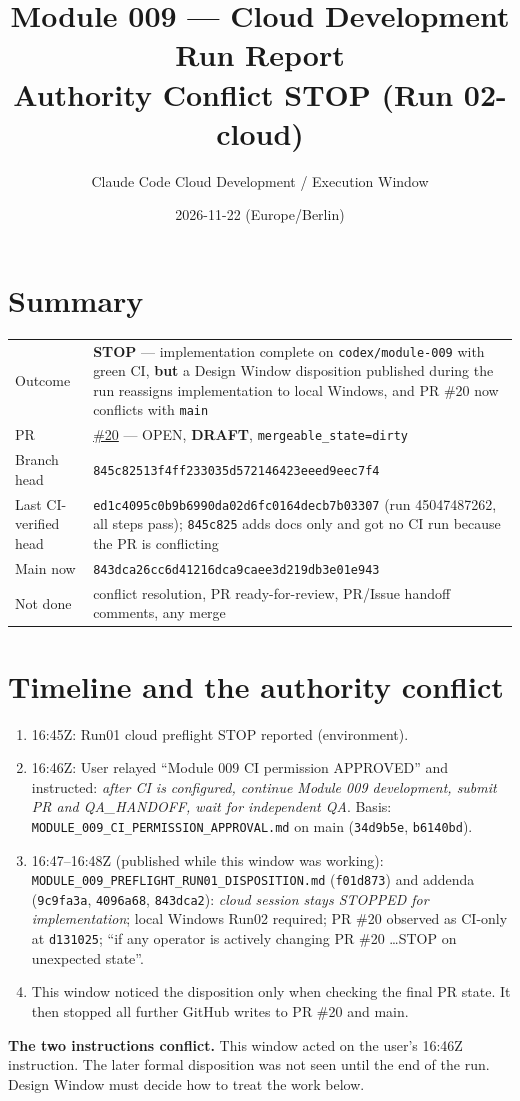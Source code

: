 \documentclass[11pt,a4paper]{article}
\title{Module 009 --- Cloud Development Run Report\\Authority Conflict STOP (Run 02-cloud)}
\author{Claude Code Cloud Development / Execution Window}
\date{2026-11-22 (Europe/Berlin)}
\newcommand{\sha}[1]{\texttt{\small #1}}
\newcommand{\STOP}{\textcolor{red!70!black}{\textbf{STOP}}}
\begin{document}
\maketitle

\section*{Summary}
\begin{tabularx}{\textwidth}{@{}lX@{}}
\toprule
Outcome & \STOP{} --- implementation complete on \texttt{codex/module-009} with green CI, \textbf{but} a Design Window disposition published during the run reassigns implementation to local Windows, and PR \#20 now conflicts with \texttt{main} \\
PR & \href{https://github.com/zyyu1/personal-workspace/pull/20}{\#20} --- OPEN, \textbf{DRAFT}, \texttt{mergeable\_state=dirty} \\
Branch head & \sha{845c82513f4ff233035d572146423eeed9eec7f4} \\
Last CI-verified head & \sha{ed1c4095c0b9b6990da02d6fc0164decb7b03307} (run 45047487262, all steps pass); \sha{845c825} adds docs only and got no CI run because the PR is conflicting \\
Main now & \sha{843dca26cc6d41216dca9caee3d219db3e01e943} \\
Not done & conflict resolution, PR ready-for-review, PR/Issue handoff comments, any merge \\
\bottomrule
\end{tabularx}

\section{Timeline and the authority conflict}
\begin{enumerate}[nosep]
  \item 16:45Z: Run01 cloud preflight STOP reported (environment).
  \item 16:46Z: User relayed ``Module 009 CI permission APPROVED'' and instructed: \emph{after CI is configured, continue Module 009 development, submit PR and QA\_HANDOFF, wait for independent QA}. Basis: \texttt{MODULE\_009\_CI\_PERMISSION\_APPROVAL.md} on main (\sha{34d9b5e}, \sha{b6140bd}).
  \item 16:47--16:48Z (published while this window was working): \texttt{MODULE\_009\_PREFLIGHT\_RUN01\_DISPOSITION.md} (\sha{f01d873}) and addenda (\sha{9c9fa3a}, \sha{4096a68}, \sha{843dca2}): \emph{cloud session stays STOPPED for implementation}; local Windows Run02 required; PR \#20 observed as CI-only at \sha{d131025}; ``if any operator is actively changing PR \#20 \ldots STOP on unexpected state''.
  \item This window noticed the disposition only when checking the final PR state. It then stopped all further GitHub writes to PR \#20 and main.
\end{enumerate}
\textbf{The two instructions conflict.} This window acted on the user's 16:46Z instruction. The later formal disposition was not seen until the end of the run. Design Window must decide how to treat the work below.
\end{document}
